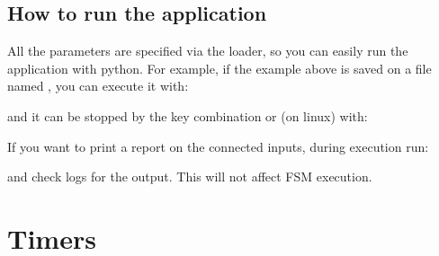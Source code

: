 \documentclass[letterpaper,10pt,english]{sphinxmanual}
\begin{document}
\begin{sphinxVerbatim}[commandchars=\\\{\}]
\end{sphinxVerbatim}


\subsection{How to run the application}
\label{\detokenize{loader:how-to-run-the-application}}
All the parameters are specified via the loader, so you can easily run the
application with python. For example, if the example above is saved on a file
named , you can execute it with:

%
\begin{sphinxVerbatim}[commandchars=\\\{\}]
 
\end{sphinxVerbatim}

and it can be stopped by the  key combination or (on linux) with:

%
\begin{sphinxVerbatim}[commandchars=\\\{\}]
   
\end{sphinxVerbatim}

If you want to print a report on the connected inputs, during execution run:

%
\begin{sphinxVerbatim}[commandchars=\\\{\}]
   
\end{sphinxVerbatim}

and check logs for the output. This will not affect FSM execution.


\section{Timers}
\label{\detokenize{timer:timers}}\label{\detokenize{timer:id1}}\label{\detokenize{timer::doc}}
\end{document}

